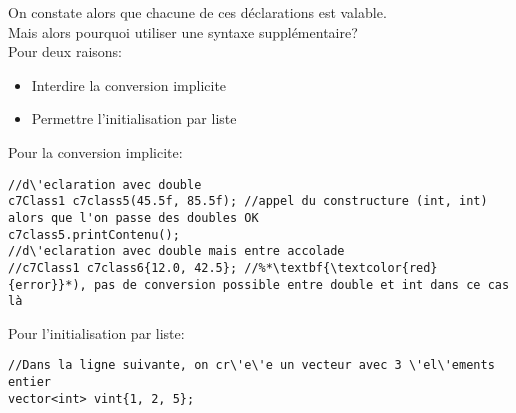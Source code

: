 \documentclass[onecolumn]{book}%
\begin{document}
On constate alors que chacune de ces d\'eclarations est valable.\\
Mais alors pourquoi utiliser une syntaxe suppl\'ementaire?\\
Pour deux raisons:
\begin{itemize}
\item Interdire la conversion implicite
\item Permettre l'initialisation par liste
\end{itemize}
Pour la conversion implicite:
\begin{framed}
\begin{lstlisting}
//d\'eclaration avec double
c7Class1 c7class5(45.5f, 85.5f); //appel du constructure (int, int) alors que l'on passe des doubles OK
c7class5.printContenu();
//d\'eclaration avec double mais entre accolade
//c7Class1 c7class6{12.0, 42.5}; //%*\textbf{\textcolor{red}{error}}*), pas de conversion possible entre double et int dans ce cas là
\end{lstlisting}
\end{framed}
Pour l'initialisation par liste:
\begin{framed}
\begin{lstlisting}
//Dans la ligne suivante, on cr\'e\'e un vecteur avec 3 \'el\'ements entier
vector<int> vint{1, 2, 5};
\end{lstlisting}
\end{framed}
\end{document}
